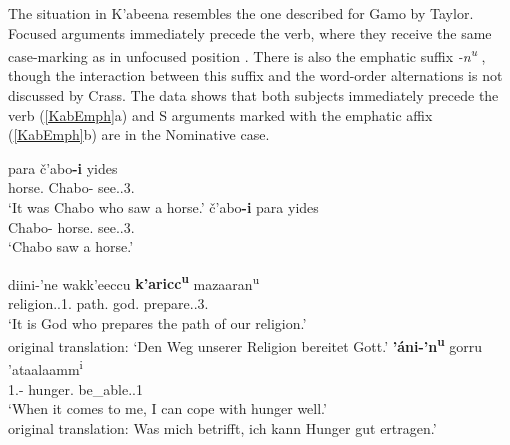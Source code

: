 The situation in K'abeena resembles the one described for Gamo by Taylor. 
Focused arguments immediately precede the verb, where they receive the same case-marking as in unfocused position \citep[327]{Crass:2005}.
There is also the emphatic suffix \emph{-n\textsuperscript{u}} \citep[256]{Crass:2005}, though the interaction between this suffix and the word-order alternations is not discussed by Crass. 
The data shows that both subjects immediately precede the verb (\ref{KabEmph}a) and S arguments marked with the emphatic affix (\ref{KabEmph}b) are in the Nominative case. %

\begin{exe}\ex\label{GamEmph}
\begin{xlist} 
\ex\gll para \v c'abo\textbf{-i} yides\\
horse.\acc{} Chabo-\nom{} see.\prf{}.3\sg{}.\mas{}\\
\glt `It was Chabo who saw a horse.'
\ex\gll \v c'abo\textbf{-i} para yides\\
Chabo-\nom{} horse.\acc{} see.\prf{}.3\sg{}.\mas{}\\
\glt `Chabo saw a horse.'
\end{xlist}
\end{exe}

\enlargethispage{\baselineskip}
\begin{exe}\ex\label{KabEmph}
\begin{xlist} 
\ex\gll diini-'ne wakk'eeccu \textbf{k'aricc\textsuperscript{u}} mazaaran\textsuperscript{u}\\
religion.\gen{}.1\pl{}.\poss{} path.\acc{} god.\nom{} prepare.\ipfv{}.3\sg{}.\mas{}\\
\glt `It is God who prepares the path of our religion.' \\
original translation: `Den Weg unserer Religion bereitet Gott.'
\ex\gll \textbf{'\'ani-'n\textsuperscript{u}} gorru 'ataalaamm\textsuperscript{i} \\
1\sg{}.\nom{}-\emphat{} hunger.\acc{} be\_able.\ipfv{}.1\sg{} \\
\glt `When it comes to me, I can cope with hunger well.' \\
original translation: Was mich betrifft, ich kann Hunger gut ertragen.'
\end{xlist}
\end{exe}

